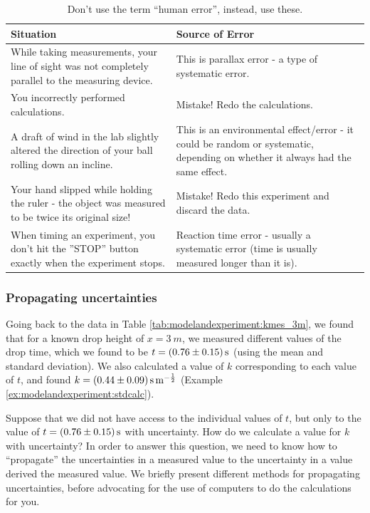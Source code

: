 \begin{table}[H]
\centering
\begin{tabular}{ll}
\hline
\parbox[t]{7.62cm}{\textbf{Situation}} & \parbox[t]{7.62cm}{\textbf{Source of Error}} \\
\hline \hline
\parbox[t]{7.62cm}{While taking measurements, your line of sight was not completely parallel to the measuring device.} & 
\parbox[t]{7.62cm}{This is parallax error - a type of systematic error.} \\
\hline
\parbox[t]{7.62cm}{You incorrectly performed calculations.} & 
\parbox[t]{7.62cm}{Mistake! Redo the calculations.} \\
\hline
\parbox[t]{7.62cm}{A draft of wind in the lab slightly altered the direction of your ball rolling down an incline.} & 
\parbox[t]{7.62cm}{This is an environmental effect/error - it could be random or systematic, depending on whether it always had the same effect.} \\
\hline
\parbox[t]{7.62cm}{Your hand slipped while holding the ruler - the object was measured to be twice its original size!} & 
\parbox[t]{7.62cm}{Mistake! Redo this experiment and discard the data.} \\
\hline
\parbox[t]{7.62cm}{When timing an experiment, you don't hit the ''STOP'' button exactly when the experiment stops.} & 
\parbox[t]{7.62cm}{Reaction time error - usually a systematic error (time is usually measured longer than it is).} \\
\hline
\end{tabular}
\caption{\label{tab:modelandexperiment:humanerror} Don't use the term ``human error'', instead, use these.}
\end{table}

\subsubsection{Propagating uncertainties}
Going back to the data in Table \ref{tab:modelandexperiment:kmes_3m}, we found that for a known drop height of $x=\SI{3}{m}$, we measured different values of the drop time, which we found to be $t=\SI{0.76 \pm 0.15}{s}$ (using the mean and standard deviation). We also calculated a value of $k$ corresponding to each value of $t$, and found $k=\SI{0.44 \pm 0.09}{s.m^{-\frac{1}{2}}}$ (Example \ref{ex:modelandexperiment:stdcalc}).

Suppose that we did not have access to the individual values of $t$, but only to the value of $t=\SI{0.76 \pm 0.15}{s}$ with uncertainty. How do we calculate a value for $k$ with uncertainty? In order to answer this question, we need to know how to ``propagate'' the uncertainties in a measured value to the uncertainty in a value derived the measured value. We briefly present different methods for propagating uncertainties, before advocating for the use of computers to do the calculations for you.

